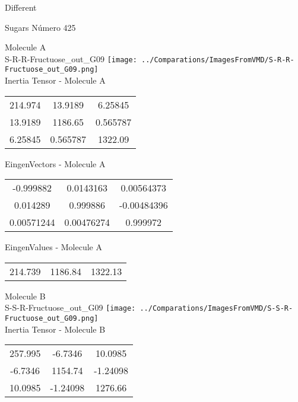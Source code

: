 \begin{center}
\vtab
\vtab
\textcolor{NavyBlue}{\Large Different}
\end{center}

 \newpage

\vtab[-2cm]
\begin{center}
{\large Sugars \tab Número 425}
\end{center}
\begin{multicols}{2}
\begin{center}

Molecule A \\ 
S-R-R-Fructuose\_out\_G09
\texttt{[image: ../Comparations/ImagesFromVMD/S-R-R-Fructuose\_out\_G09.png]}
\\
Inertia Tensor - Molecule A \\
\vtab

\begin{tabular}{|c c c|}
214.974	 & 	13.9189	 & 	6.25845	 \\
13.9189	 & 	1186.65	 & 	0.565787	 \\
6.25845	 & 	0.565787	 & 	1322.09
\end{tabular}

\vtab
 EingenVectors - Molecule A     \\
\vtab
\begin{tabular}{|c c c|}
-0.999882	 & 	0.0143163	 & 	0.00564373	 \\
0.014289	 & 	0.999886	 & 	-0.00484396	 \\
0.00571244	 & 	0.00476274	 & 	0.999972
\end{tabular}

\vtab
 EingenValues - Molecule A     \\
\vtab
\begin{tabular}{|c c c|}
214.739	 & 	1186.84	 & 	1322.13	 \\
\end{tabular}
\columnbreak

Molecule B \\ 
S-S-R-Fructuose\_out\_G09
\texttt{[image: ../Comparations/ImagesFromVMD/S-S-R-Fructuose\_out\_G09.png]}
\\
Inertia Tensor - Molecule B \\
\vtab

\begin{tabular}{|c c c|}
257.995	 & 	-6.7346	 & 	10.0985	 \\
-6.7346	 & 	1154.74	 & 	-1.24098	 \\
10.0985	 & 	-1.24098	 & 	1276.66
\end{tabular}


\end{center}
\end{multicols}
